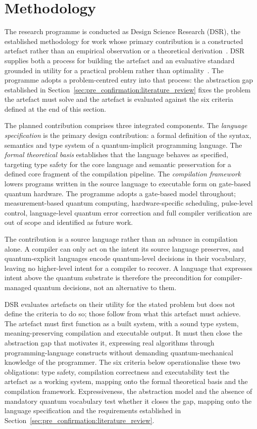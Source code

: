\section{Methodology}\label{sec:pre_confirmation:methodology}
The research programme is conducted as Design Science Research (DSR), the established methodology for work whose primary contribution is a constructed artefact rather than an empirical observation or a theoretical derivation~\cite{Hevner2004DesignScienceIS}.
DSR supplies both a process for building the artefact and an evaluative standard grounded in utility for a practical problem rather than optimality~\cite{Hevner2004DesignScienceIS}.
The programme adopts a problem-centred entry into that process: the abstraction gap established in Section~\ref{sec:pre_confirmation:literature_review} fixes the problem the artefact must solve and the artefact is evaluated against the six criteria defined at the end of this section.

The planned contribution comprises three integrated components.
The \textit{language specification} is the primary design contribution: a formal definition of the syntax, semantics and type system of a quantum-implicit programming language.
The \textit{formal theoretical basis} establishes that the language behaves as specified, targeting type safety for the core language and semantic preservation for a defined core fragment of the compilation pipeline.
The \textit{compilation framework} lowers programs written in the source language to executable form on gate-based quantum hardware.
The programme adopts a gate-based model throughout; measurement-based quantum computing, hardware-specific scheduling, pulse-level control, language-level quantum error correction and full compiler verification are out of scope and identified as future work.

The contribution is a source language rather than an advance in compilation alone.
A compiler can only act on the intent its source language preserves, and quantum-explicit languages encode quantum-level decisions in their vocabulary, leaving no higher-level intent for a compiler to recover.
A language that expresses intent above the quantum substrate is therefore the precondition for compiler-managed quantum decisions, not an alternative to them.

DSR evaluates artefacts on their utility for the stated problem but does not define the criteria to do so; those follow from what this artefact must achieve.
The artefact must first function as a built system, with a sound type system, meaning-preserving compilation and executable output.
It must then close the abstraction gap that motivates it, expressing real algorithms through programming-language constructs without demanding quantum-mechanical knowledge of the programmer.
The six criteria below operationalise these two obligations: type safety, compilation correctness and executability test the artefact as a working system, mapping onto the formal theoretical basis and the compilation framework.
Expressiveness, the abstraction model and the absence of mandatory quantum vocabulary test whether it closes the gap, mapping onto the language specification and the requirements established in Section~\ref{sec:pre_confirmation:literature_review}.

